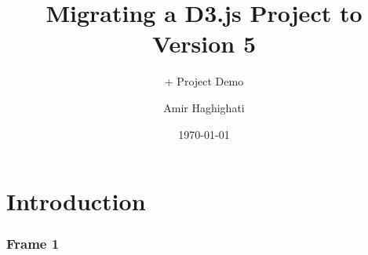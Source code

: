 \documentclass[11pt]{beamer}
\begin{document}
	\author{Amir Haghighati}
	\title{Migrating a D3.js Project to Version 5}
	\subtitle{+ Project Demo}
	\date{\today}
	\subject{Lab Presentations}
	\begin{frame}
	\maketitle
\end{frame}

\section{Introduction}
\begin{frame}
\frametitle{Frame 1}
\end{frame}
\end{document}
